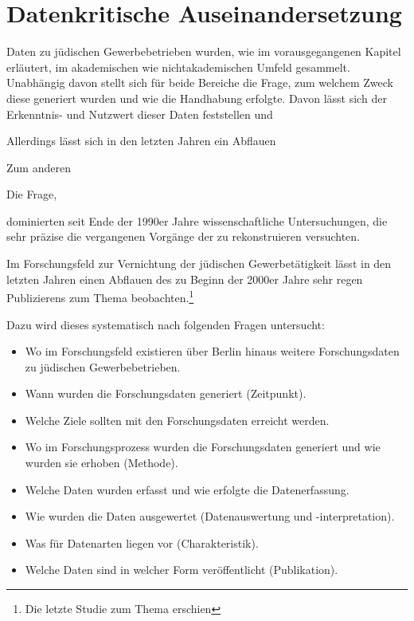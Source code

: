  






\section{Datenkritische Auseinandersetzung}

Daten zu jüdischen Gewerbebetrieben wurden, wie im vorausgegangenen Kapitel erläutert, im akademischen wie nichtakademischen Umfeld gesammelt. Unabhängig davon stellt sich für beide Bereiche die Frage, zum welchem Zweck diese generiert wurden und wie die Handhabung erfolgte. Davon lässt sich der Erkenntnis- und Nutzwert dieser Daten feststellen und 





Allerdings lässt sich in den letzten Jahren ein Abflauen

Zum anderen

Die Frage, 

 dominierten seit Ende der 1990er Jahre wissenschaftliche Untersuchungen, die sehr präzise die vergangenen Vorgänge der zu rekonstruieren versuchten.      


Im Forschungsfeld zur Vernichtung der jüdischen Gewerbetätigkeit lässt in den letzten Jahren einen Abflauen des zu Beginn der 2000er Jahre sehr regen Publizierens zum Thema beobachten.\footnote{Die letzte Studie zum Thema erschien}


Dazu wird dieses systematisch nach folgenden Fragen untersucht:

\begin{itemize}
\item Wo im Forschungsfeld existieren über Berlin hinaus weitere Forschungsdaten zu jüdischen Gewerbebetrieben.
\item Wann wurden die Forschungsdaten generiert (Zeitpunkt).
\item Welche Ziele sollten mit den Forschungsdaten erreicht werden.
\item Wo im Forschungsprozess wurden die Forschungsdaten generiert und wie wurden sie erhoben (Methode). 
\item Welche Daten wurden erfasst und wie erfolgte die Datenerfassung.
\item Wie wurden die Daten ausgewertet (Datenauswertung und -interpretation).
\item Was für Datenarten liegen vor (Charakteristik).
\item Welche Daten sind in welcher Form veröffentlicht (Publikation).
\end{itemize}


